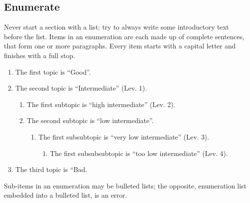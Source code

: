 \subsection{Enumerate}
Never start a section with a list; try to always write some introductory text before the list. Items in an enumeration are each made up of complete sentences, that form one or more paragraphs. Every item starts with a capital letter and finishes with a full stop.
\begin{enumerate}
	\item The first topic is ``Good''.
	\item The second topic is ``Intermediate'' (Lev. 1).
	\begin{enumerate}
		\item The first subtopic is ``high intermediate'' (Lev. 2).
		\item The second subtopic is ``low intermediate''.
		\begin{enumerate}
			\item The first subsubtopic is ``very low intermediate'' (Lev. 3).
			\begin{enumerate}
				\item The first subsubsubtopic is ``too low intermediate'' (Lev. 4).
			\end{enumerate}
		\end{enumerate}
	\end{enumerate}
	\item The third topic is ``Bad.
\end{enumerate}

Sub-items in an enumeration may be bulleted lists; the opposite, enumeration list embedded into a bulleted list, is an error.

